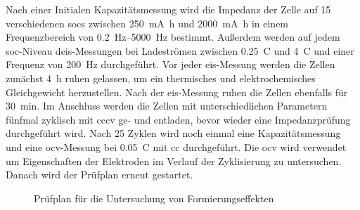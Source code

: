 Nach einer Initialen Kapazitätsmessung wird die Impedanz der Zelle auf 15 verschiedenen \glspl{soc} zwischen
\SI{250}{\milli\ampere\hour} und \SI{2000}{\milli\ampere\hour} in einem Frequenzbereich von \SIrange{0,2}{5000}{\hertz} bestimmt.
Außerdem werden auf jedem \gls{soc}-Niveau \gls{deis}-Messungen bei Ladeströmen zwischen \SI{0,25}{C} und \SI{4}{C}
und einer Frequenz von \SI{200}{\hertz} durchgeführt.
Vor jeder \gls{eis}-Messung werden die Zellen zunächst \SI{4}{\hour} ruhen gelassen, um ein thermisches und
elektrochemisches Gleichgewicht herzustellen.
Nach der \gls{eis}-Messung ruhen die Zellen ebenfalls für \SI{30}{\minute}.
Im Anschluss werden die Zellen mit unterschiedlichen Parametern fünfmal zyklisch mit \gls{cccv} ge- und entladen, bevor
wieder eine
Impedanzprüfung durchgeführt wird.
Nach 25 Zyklen wird noch einmal eine Kapazitätsmessung und eine \gls{ocv}-Messung bei \SI{0,05}{C}
mit \gls{cc} durchgeführt.
Die \gls{ocv} wird verwendet um Eigenschaften der Elektroden im Verlauf der Zyklisierung zu untersuchen.
Danach wird der Prüfplan erneut gestartet.

\begin{figure} [h]
    \hspace{3cm}%
    \centering
    \caption{Prüfplan für die Untersuchung von Formierungseffekten}\label{fig:pruefplan-bio}
\end{figure}

